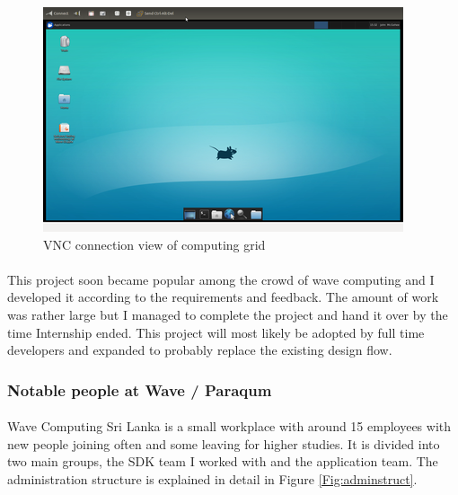 \begin{figure}[H]
    \centering
    \includegraphics[trim=0cm 0cm 0cm 0cm, clip=true,scale=0.8]{figures/vnc.png}
    \caption{VNC connection view of computing grid\label{Fig:vnc}}\vspace{-4mm}
    \end{figure}

\paragraph{}
This project soon became popular among the crowd of wave computing and I developed it according to the requirements and feedback. The amount of work was rather large but I managed to complete the project and hand it over by the time Internship ended. This project will most likely be adopted by full time developers and expanded to probably replace the existing design flow.

\subsubsection{Notable people at Wave / Paraqum}

\paragraph{}
Wave Computing Sri Lanka is a small workplace with around 15 employees with new people joining often and some leaving for higher studies. It is divided into two main groups, the SDK team I worked with and the application team. The administration structure is explained in detail in Figure \ref{Fig:adminstruct}. 

